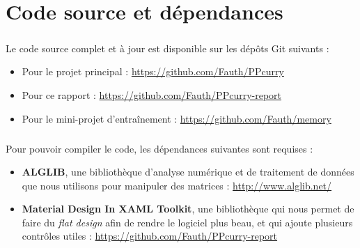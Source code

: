 \chapter{Code source et dépendances}

\paragraph{}Le code source complet et à jour est disponible sur les dépôts Git suivants :
\begin{itemize}
	\item Pour le projet principal : \url{https://github.com/Fauth/PPcurry}
	\item Pour ce rapport : \url{https://github.com/Fauth/PPcurry-report}
	\item Pour le mini-projet d'entraînement : \url{https://github.com/Fauth/memory}
\end{itemize}

\paragraph{}Pour pouvoir compiler le code, les dépendances suivantes sont requises :
\begin{itemize}
	\item \textbf{ALGLIB}, une bibliothèque d'analyse numérique et de traitement de données que nous utilisons pour manipuler des matrices : \url{http://www.alglib.net/}
	\item \textbf{Material Design In XAML Toolkit}, une bibliothèque qui nous permet de faire du \textit{flat design} afin de rendre le logiciel plus beau, et qui ajoute plusieurs contrôles utiles : \url{https://github.com/Fauth/PPcurry-report}
\end{itemize}